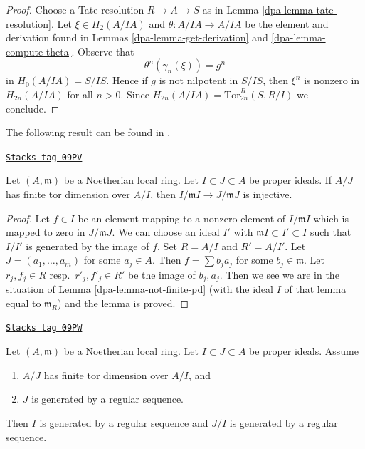 \begin{proof}

Choose a Tate resolution $R \to A \to S$ as in
Lemma \ref{dpa-lemma-tate-resolution}.
Let $\xi \in H_2(A/IA)$ and $\theta : A/IA \to A/IA$ be the element
and derivation found in Lemmas \ref{dpa-lemma-get-derivation} and
\ref{dpa-lemma-compute-theta}.
Observe that
$$
\theta^n(\gamma_n(\xi)) = g^n
$$
in $H_0(A/IA) = S/IS$.
Hence if $g$ is not nilpotent in $S/IS$, then $\xi^n$ is nonzero in
$H_{2n}(A/IA)$ for all $n > 0$. Since
$H_{2n}(A/IA) = \text{Tor}^R_{2n}(S, R/I)$ we conclude.
\end{proof}

The following result can be found in \cite{Rodicio}.

\begin{lemma}[Injective]
\label{dpa-lemma-injective}
\href{https://stacks.math.columbia.edu/tag/09PV}{\texttt{Stacks tag 09PV}}

Let $(A, \mathfrak m)$ be a Noetherian local ring. Let
$I \subset J \subset A$ be proper ideals. If $A/J$ has finite
tor dimension over $A/I$, then $I/\mathfrak m I \to J/\mathfrak m J$
is injective.
\end{lemma}

\begin{proof}

Let $f \in I$ be an element mapping to a nonzero element of $I/\mathfrak m I$
which is mapped to zero in $J/\mathfrak mJ$. We can choose an ideal $I'$
with $\mathfrak mI \subset I' \subset I$ such that $I/I'$ is generated by
the image of $f$. Set $R = A/I$ and $R' = A/I'$. Let $J = (a_1, \ldots, a_m)$
for some $a_j \in A$. Then $f = \sum b_j a_j$ for some $b_j \in \mathfrak m$.
Let $r_j, f_j \in R$ resp.\ $r'_j, f'_j \in R'$ be the image of $b_j, a_j$.
Then we see we are
in the situation of Lemma \ref{dpa-lemma-not-finite-pd}
(with the ideal $I$ of that lemma equal to $\mathfrak m_R$)
and the lemma is proved.
\end{proof}

\begin{lemma}
\label{dpa-lemma-regular-sequence}
\href{https://stacks.math.columbia.edu/tag/09PW}{\texttt{Stacks tag 09PW}}

Let $(A, \mathfrak m)$ be a Noetherian local ring. Let
$I \subset J \subset A$ be proper ideals. Assume
\begin{enumerate}
\item $A/J$ has finite tor dimension over $A/I$, and
\item $J$ is generated by a regular sequence.
\end{enumerate}
Then $I$ is generated by a regular sequence and $J/I$
is generated by a regular sequence.
\end{lemma}

